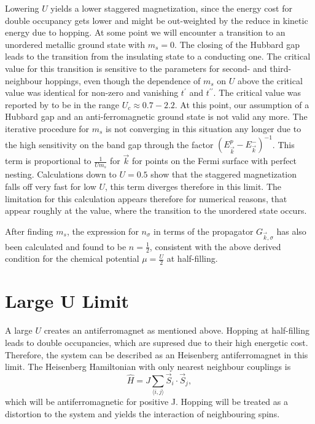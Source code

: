 \documentclass[a4paper,12pt]{report}
\begin{document}
Lowering $U$ yields a lower staggered magnetization, since the energy cost for double occupancy gets lower and might be out-weighted by
the reduce in kinetic energy due to hopping.
%
At some point we will encounter a transition to an unordered metallic ground state with $m_s=0$. 
The closing of the Hubbard gap leads to the transition from the insulating state to a conducting one.
The critical value for this transition is sensitive to the parameters for second- and third-neighbour hoppings, 
even though the dependence of $m_s$ on $U$ above the critical value was identical for non-zero and vanishing $t^{\prime}$ and $t^{\prime \prime}$.
The critical value was reported by \citet{PhysRevB.88.035111} to be in the range $U_c \approx 0.7 - 2.2$.
At this point, our assumption of a Hubbard gap and an anti-ferromagnetic ground state is not valid any more. 
The iterative procedure for $m_s$ is not converging in this situation any longer due to the high sensitivity on the band gap through the factor $(E^p_{\vec k} - E^-_{\vec k})^{-1}$.
This term is proportional to $\frac{1}{Um_s}$ for $\vec k$ for points on the Fermi surface with perfect nesting.
Calculations down to $U=0.5$ show that the staggered magnetization falls off very fast for low $U$, this term diverges therefore in this limit.
The limitation for this calculation appears therefore for numerical reasons, that appear roughly at the value, where the transition to the unordered state occurs. 

After finding $m_{s}$, the expression for $n_{\sigma}$ in terms of the propagator $G_{\vec k,\sigma}$ has also been calculated and found to be $n=\frac12$, 
consistent with the above derived condition for the chemical potential $\mu=\frac U2$ at half-filling.



\section{Large U Limit}

A large $U$ creates an antiferromagnet as mentioned above. 
Hopping at half-filling leads to double occupancies, which are supresed due to their high energetic cost. 
Therefore, the system can be described as an Heisenberg antiferromagnet in this limit.
The Heisenberg Hamiltonian with only nearest neighbour couplings is
\begin{equation}
 \hat H = J \sum_{\langle i,j\rangle} \vec{S}_i \cdot \vec{S}_j,
\end{equation}
which will be antiferromagnetic for positive J. 
Hopping will be treated as a distortion to the system and yields the interaction of neighbouring spins.
\end{document}
